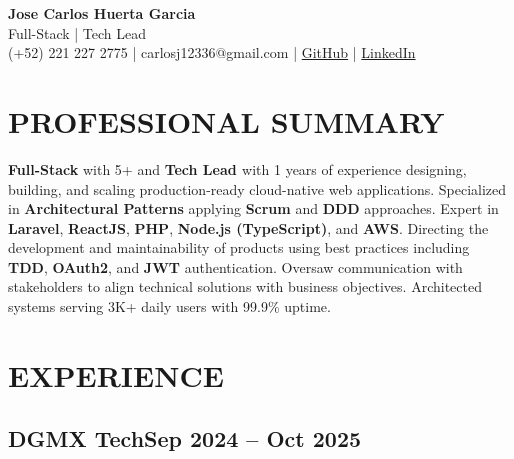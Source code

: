 \documentclass[a4paper,10pt]{article}
\newcommand{\kw}[1]{\textbf{\textcolor{keyword}{#1}}}
\begin{document}
\begin{center}
{\bfseries\LARGE Jose Carlos Huerta Garcia} \\
Full-Stack | Tech Lead \\
(+52) 221 227 2775 | carlosj12336@gmail.com | \href{https://github.com/jcarloshg}{GitHub} | \href{https://www.linkedin.com/in/jose-carlos-huerta-garcia-773952212}{LinkedIn}
\end{center}

\section*{PROFESSIONAL SUMMARY}
\kw{Full-Stack} with 5+ and \kw{Tech Lead } with 1 years of experience designing, building, and scaling production-ready cloud-native web applications. Specialized in \kw{Architectural Patterns} applying \kw{Scrum} and \kw{DDD} approaches. Expert in \kw{Laravel}, \kw{ReactJS}, \kw{PHP}, \kw{Node.js (TypeScript)}, and \kw{AWS}. Directing the development and maintainability of products using best practices including \kw{TDD}, \kw{OAuth2}, and \kw{JWT} authentication. Oversaw communication with stakeholders to align technical solutions with business objectives. Architected systems serving 3K+ daily users with 99.9\% uptime.

\section*{EXPERIENCE}

\subsection*{\small DGMX Tech\hfill\textbf{Sep 2024 -- Oct 2025}}
\end{document}
